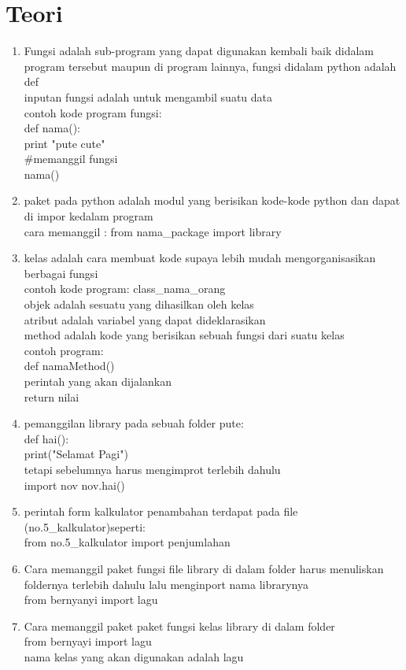 \chapter*{Teori}

\begin{enumerate}
	\item Fungsi adalah sub-program yang dapat digunakan kembali baik didalam program tersebut maupun di program lainnya, fungsi didalam python adalah def\\
	inputan fungsi adalah untuk mengambil suatu data\\
	contoh kode program fungsi:\\
	def nama():\\
	  print "pute cute"\\
	 \#memanggil fungsi\\ 
	 nama()
	
	\item paket pada python adalah modul yang berisikan kode-kode python dan dapat di impor kedalam program\\
	cara memanggil : from nama\_package import library
	
	\item kelas adalah cara membuat kode supaya lebih mudah mengorganisasikan berbagai fungsi\\
	contoh kode program: class\_nama\_orang\\
	objek adalah sesuatu yang dihasilkan oleh kelas\\
	atribut adalah variabel yang dapat dideklarasikan\\
	method adalah kode yang berisikan sebuah fungsi dari suatu kelas\\
	contoh program: \\
	def namaMethod()\\
	perintah yang akan dijalankan\\
	return nilai
	
	\item pemanggilan library pada sebuah folder pute:\\
	def hai():\\
	print("Selamat Pagi")\\
	tetapi sebelumnya harus mengimprot terlebih dahulu\\
	import nov 
	nov.hai()
	
	\item perintah form kalkulator penambahan terdapat pada file (no.5\_kalkulator)seperti:\\
	from no.5\_kalkulator import penjumlahan
	
	\item Cara memanggil paket fungsi file library di dalam folder harus menuliskan foldernya terlebih dahulu lalu menginport nama librarynya\\
	from bernyanyi import lagu 
	
	\item Cara memanggil paket paket fungsi kelas library di dalam folder\\
	from bernyayi import lagu\\
	nama kelas yang akan digunakan adalah lagu
	


\end{enumerate}
